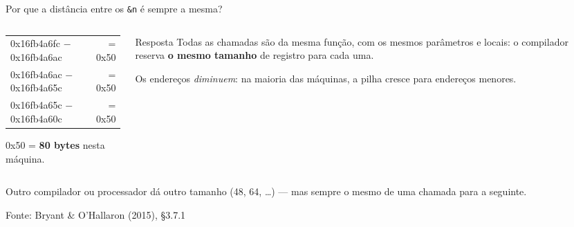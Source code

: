 \documentclass[aspectratio=169]{beamer}
\newcommand{\fonte}[1]{\vfill\hfill{\scriptsize\textcolor{UFSGray}{Fonte: #1}}}
\begin{document}
\begin{frame}{Por que a distância entre os \texttt{\&n} é sempre a mesma?}
  \begin{columns}[c]
    \begin{column}{0.5\textwidth}
      \ttfamily\scriptsize
      \begin{tabular}{l@{\quad}r}
        0x16fb4a6fc $-$ 0x16fb4a6ac & = 0x50\\
        0x16fb4a6ac $-$ 0x16fb4a65c & = 0x50\\
        0x16fb4a65c $-$ 0x16fb4a60c & = 0x50
      \end{tabular}

      \medskip
      \normalfont\small 0x50 = \textbf{80 bytes} nesta máquina.
    \end{column}
    \begin{column}{0.46\textwidth}
      \begin{block}{Resposta}
        \small Todas as chamadas são da mesma função, com os mesmos
        parâmetros e locais: o compilador reserva \textbf{o mesmo tamanho}
        de registro para cada uma.

        \medskip
        Os endereços \emph{diminuem}: na maioria das máquinas, a pilha
        cresce para endereços menores.
      \end{block}
    \end{column}
  \end{columns}
  \begin{center}
    \scriptsize\textcolor{UFSGray}{Outro compilador ou processador dá outro
    tamanho (48, 64, \ldots) --- mas sempre o mesmo de uma chamada para a
    seguinte.}
  \end{center}
  \fonte{Bryant \& O'Hallaron (2015), §3.7.1~\cite{bryant2015computer}}
\end{frame}
\end{document}
